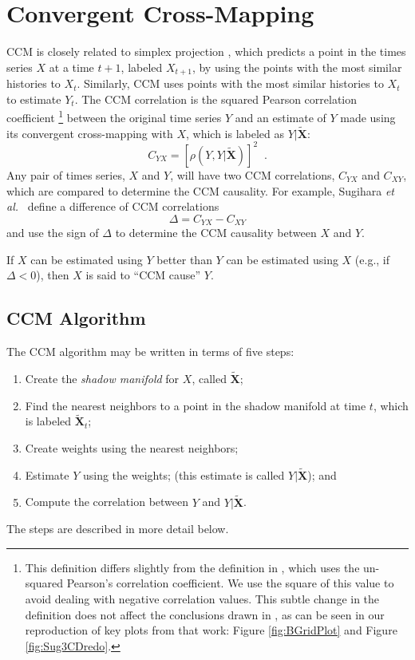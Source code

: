 \documentclass[twocolumn,aps,pre,groupedaddress]{revtex4-1}
\begin{document}
\section{Convergent Cross-Mapping}
CCM is closely related to simplex projection \cite{Sugihara1990,Sugihara1990a}, which predicts a point in the times series $X$ at a time $t+1$, labeled $X_{t+1}$, by using the points with the most similar histories to $X_t$.  Similarly, CCM uses points with the most similar histories to $X_t$ to estimate $Y_t$.  The CCM correlation is the squared Pearson correlation coefficient \footnote{This definition differs slightly from the definition in \cite{Sugihara2012}, which uses the un-squared Pearson’s correlation coefficient.  We use the square of this value to avoid dealing with negative correlation values.  This subtle change in the definition does not affect the conclusions drawn in \cite{Sugihara2012}, as can be seen in our reproduction of key plots from that work: Figure \ref{fig:BGridPlot} and Figure \ref{fig:Sug3CDredo}.} between the original time series $Y$ and an estimate of $Y$ made using its convergent cross-mapping with $X$, which is labeled as $Y|\tilde{\mathbf{X}}$:
$$
C_{YX} = \left[\rho(Y,Y|\tilde{\mathbf{X}})\right]^2\;\;.
$$
Any pair of times series, $X$ and $Y$, will have two CCM correlations, $C_{YX}$ and $C_{XY}$, which are compared to determine the CCM causality.  For example, Sugihara {\em et al.\ }\cite{Sugihara2012} define a difference of CCM correlations
\begin{equation}
\label{eqn:delta}
\Delta = C_{YX} - C_{XY}
\end{equation}
and use the sign of $\Delta$ to determine the CCM causality between $X$ and $Y$.

If $X$ can be estimated using $Y$ better than $Y$ can be estimated using $X$ (e.g., if $\Delta < 0$), then $X$ is said to ``CCM cause'' $Y$.

\subsection{CCM Algorithm}
\label{sec:appA}
The CCM algorithm may be written in terms of five steps:
\begin{enumerate}
\item 
Create the {\em shadow manifold} for $X$, called $\tilde{\mathbf{X}}$;
\item Find the nearest neighbors to a point in the shadow manifold at time $t$, which is labeled $\tilde{\mathbf{X}}_t$;
\item Create weights using the nearest neighbors;
\item Estimate $Y$ using the weights; (this estimate is called $Y|\tilde{\mathbf{X}}$); and
\item Compute the correlation between $Y$ and $Y|\tilde{\mathbf{X}}$. 
\end{enumerate}
The steps are described in more detail below.  
\end{document}
